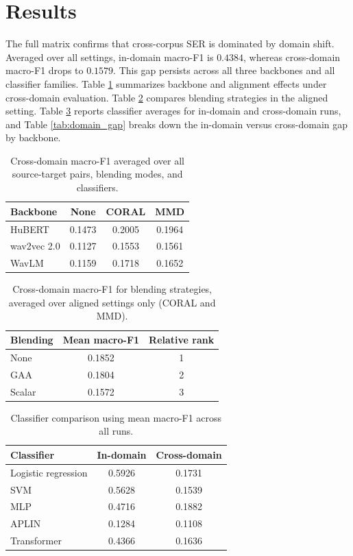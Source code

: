 ﻿\documentclass[10pt,twocolumn,letterpaper]{article}
\begin{document}
\section{Results}
The full matrix confirms that cross-corpus SER is dominated by domain shift. Averaged over all settings, in-domain macro-F1 is $0.4384$, whereas cross-domain macro-F1 drops to $0.1579$. This gap persists across all three backbones and all classifier families. Table \ref{tab:backbone_alignment} summarizes backbone and alignment effects under cross-domain evaluation. Table \ref{tab:blending} compares blending strategies in the aligned setting. Table \ref{tab:classifier} reports classifier averages for in-domain and cross-domain runs, and Table \ref{tab:domain_gap} breaks down the in-domain versus cross-domain gap by backbone.

\begin{table}[t]
\centering
\caption{Cross-domain macro-F1 averaged over all source-target pairs, blending modes, and classifiers.}
\label{tab:backbone_alignment}
\scriptsize
\setlength{\tabcolsep}{4pt}
\begin{tabular}{lccc}
\hline
Backbone & None & CORAL & MMD \\
\hline
HuBERT & 0.1473 & 0.2005 & 0.1964 \\
wav2vec 2.0 & 0.1127 & 0.1553 & 0.1561 \\
WavLM & 0.1159 & 0.1718 & 0.1652 \\
\hline
\end{tabular}
\end{table}

\begin{table}[t]
\centering
\caption{Cross-domain macro-F1 for blending strategies, averaged over aligned settings only (CORAL and MMD).}
\label{tab:blending}
\scriptsize
\setlength{\tabcolsep}{4pt}
\begin{tabular}{lcc}
\hline
Blending & Mean macro-F1 & Relative rank \\
\hline
None & 0.1852 & 1 \\
GAA & 0.1804 & 2 \\
Scalar & 0.1572 & 3 \\
\hline
\end{tabular}
\end{table}

\begin{table}[t]
\centering
\caption{Classifier comparison using mean macro-F1 across all runs.}
\label{tab:classifier}
\scriptsize
\setlength{\tabcolsep}{4pt}
\begin{tabular}{lcc}
\hline
Classifier & In-domain & Cross-domain \\
\hline
Logistic regression & 0.5926 & 0.1731 \\
SVM & 0.5628 & 0.1539 \\
MLP & 0.4716 & 0.1882 \\
APLIN & 0.1284 & 0.1108 \\
Transformer & 0.4366 & 0.1636 \\
\hline
\end{tabular}
\end{table}
\end{document}
